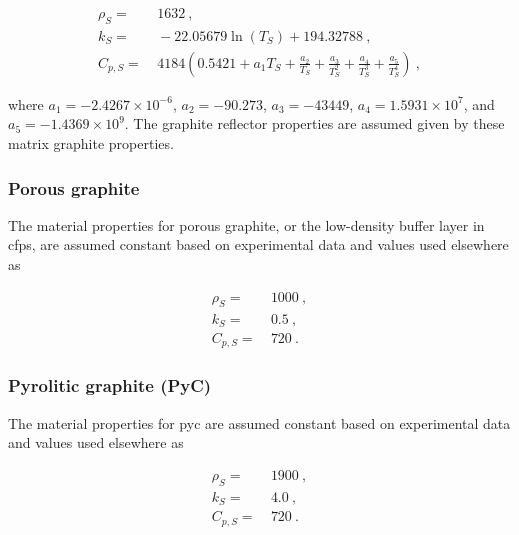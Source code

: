\begin{appendices}
\begin{subequations}
\begin{align}
\rho_S=&\ 1632\ ,\\
\label{eq:k_mg}
k_S=&\ -22.05679\ln{(T_S)}+194.32788\ , \\
\label{eq:Butland_cp2}
C_{p,S} =&\ 4184\left(0.5421+a_1T_S+\frac{a_2}{T_S}+\frac{a_3}{T_S^2}+\frac{a_4}{T_S^3}+\frac{a_5}{T_S^4}\right)\ ,
\end{align}
\end{subequations}

\noindent where \(a_1=-2.4267\times10^{-6}\), \(a_2=-90.273\), \(a_3=-43449\), \(a_4=1.5931\times10^7\), and \(a_5=-1.4369\times10^9\). The graphite reflector properties are assumed given by these matrix graphite properties.


\subsubsection*{Porous graphite}
The material properties for porous graphite, or the low-density buffer layer in \glspl{cfp}, are assumed constant based on experimental data and values used elsewhere \cite{sun,tecdoc1694,xin_wang_thesis,stainsby,parfume,hales,rochais,lopez_honorato} as

\begin{subequations}
\begin{align}
\rho_S=&\ 1000\ ,\\
k_S =&\ 0.5\ , \\
C_{p,S} =&\ 720\ .
\end{align}
\end{subequations}

\subsubsection*{Pyrolitic graphite (PyC)}
The material properties for \gls{pyc} are assumed constant based on experimental data and values used elsewhere \cite{sun,xin_wang_thesis,tecdoc1694,slack,bokros,basini,hales,rochais,stainsby,parfume,cao} as

\begin{subequations}
\begin{align}
\rho_S=&\ 1900\ ,\\
k_S =&\ 4.0\ , \\
C_{p,S} =&\ 720\ .
\end{align}
\end{subequations}


\end{appendices}
